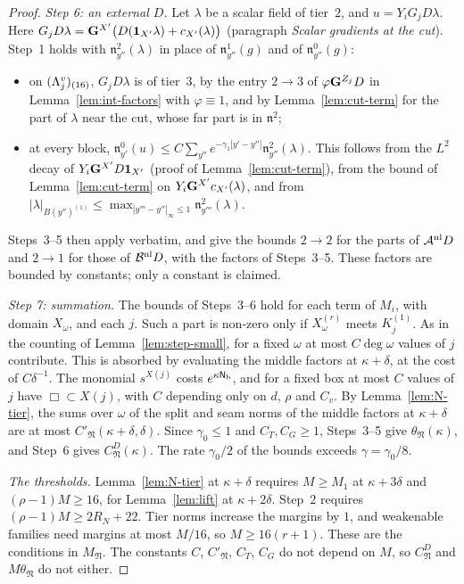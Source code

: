 \begin{proof}
\emph{Step 6: an external $D$.} Let $\lambda$ be a scalar field of tier~$2$, and $u=Y_iG_jD\lambda$. Here $G_jD\lambda=\mathbf G^{X'}\big(D(\mathbf 1_{X'}\lambda)+c_{X'}(\lambda)\big)$ (paragraph \emph{Scalar gradients at the cut}). Step~1 holds with $\mathfrak n^2_{y''}(\lambda)$ in place of $\mathfrak n^1_{y''}(g)$ and of $\mathfrak n^0_{y''}(g)$:
\begin{itemize}
\item on $(\Lambda^v_j)_{(16)}$, $G_jD\lambda$ is of tier~$3$, by the entry $2\to3$ of $\varphi\mathbf G^{Z_j}D$ in Lemma~\ref{lem:int-factors} with $\varphi\equiv1$, and by Lemma~\ref{lem:cut-term} for the part of $\lambda$ near the cut, whose far part is in $\mathfrak n^2$;
\item at every block, $\mathfrak n^0_{y'}(u)\le C\sum_{y''}e^{-\gamma_1|y'-y''|}\mathfrak n^2_{y''}(\lambda)$. This follows from the $L^2$ decay of $Y_i\mathbf G^{X'}D\mathbf 1_{X'}$ (proof of Lemma~\ref{lem:cut-term}), from the bound of Lemma~\ref{lem:cut-term} on $Y_i\mathbf G^{X'}c_{X'}(\lambda)$, and from $|\lambda|_{B(y'')^{(1)}}\le\max_{|y'''-y''|_\infty\le1}\mathfrak n^2_{y'''}(\lambda)$.
\end{itemize}
Steps~3--5 then apply verbatim, and give the bounds $2\to2$ for the parts of $\mathcal A^{\rm nl}D$ and $2\to1$ for those of $\mathcal B^{\rm nl}D$, with the factors of Steps~3--5. These factors are bounded by constants; only a constant is claimed.

\emph{Step 7: summation.} The bounds of Steps~3--6 hold for each term of $M_i$, with domain $X_\omega$, and each $j$. Such a part is non-zero only if $X_\omega^{(r)}$ meets $K_j^{(1)}$. As in the counting of Lemma~\ref{lem:step-small}, for a fixed $\omega$ at most $C\deg\omega$ values of $j$ contribute. This is absorbed by evaluating the middle factors at $\kappa+\delta$, at the cost of $C\delta^{-1}$. The monomial $s^{X(j)}$ costs $e^{\kappa\mathsf N_{\rm b}}$, and for a fixed box at most $C$ values of $j$ have $\Box\subset X(j)$, with $C$ depending only on $d$, $\rho$ and $C_v$. By Lemma~\ref{lem:N-tier}, the sums over $\omega$ of the split and seam norms of the middle factors at $\kappa+\delta$ are at most $C'_{\mathfrak N}(\kappa+\delta,\delta)$. Since $\gamma_0\le1$ and $C_T,C_G\ge1$, Steps~3--5 give $\theta_{\mathfrak N}(\kappa)$, and Step~6 gives $C^D_{\mathfrak N}(\kappa)$. The rate $\gamma_0/2$ of the bounds exceeds $\gamma=\gamma_0/8$.

\emph{The thresholds.} Lemma~\ref{lem:N-tier} at $\kappa+\delta$ requires $M\ge M_1$ at $\kappa+3\delta$ and $(\rho-1)M\ge16$, for Lemma~\ref{lem:lift} at $\kappa+2\delta$. Step~2 requires $(\rho-1)M\ge2R_N+22$. Tier norms increase the margins by $1$, and weakenable families need margins at most $M/16$, so $M\ge16(r+1)$. These are the conditions in $M_{\mathfrak N}$. The constants $C$, $C'_{\mathfrak N}$, $C_T$, $C_G$ do not depend on $M$, so $C^D_{\mathfrak N}$ and $M\theta_{\mathfrak N}$ do not either.
\end{proof}

